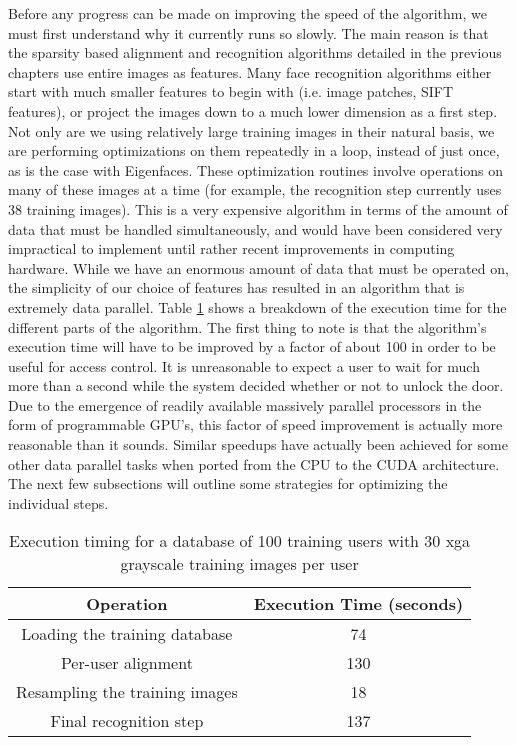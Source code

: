 Before any progress can be made on improving the speed of the algorithm, we
must first understand why it currently runs so slowly. The main reason is that
the sparsity based alignment and recognition algorithms detailed in the
previous chapters use entire images as features.  Many face recognition
algorithms either start with much smaller features to begin with (i.e. image
patches, SIFT features), or project the images down to a much lower dimension
as a first step.  Not only are we using relatively large training images in
their natural basis, we are performing optimizations on them repeatedly in a
loop, instead of just once, as is the case with Eigenfaces.   These
optimization routines involve operations on many of these images at a time (for
example, the recognition step currently uses 38 training images).  This is a
very expensive algorithm in terms of the amount of data that must be handled
simultaneously, and would have been considered very impractical to implement
until rather recent improvements in computing hardware.  While we have an
enormous amount of data that must be operated on, the simplicity of our choice
of features has resulted in an algorithm that is extremely data parallel.
Table \ref{tab:breakdown} shows a breakdown of the execution time for the
different parts of the algorithm.  The first thing to note is that the
algorithm's execution time will have to be improved by a factor of about 100 in
order to be useful for access control.  It is unreasonable to expect a user to
wait for much more than a second while the system decided whether or not to
unlock the door.  Due to the emergence of readily available massively parallel
processors in the form of programmable GPU's, this factor of speed improvement
is actually more reasonable than it sounds.  Similar speedups have actually
been achieved for some other data parallel tasks when ported from the CPU to
the CUDA architecture.  The next few subsections will outline some strategies
for optimizing the individual steps.
\begin{table}[h]
\centering
\begin{tabular}{|c|c|}
\hline
Operation & Execution Time (seconds)\\
\hline
Loading the training database & 74\\
\hline
Per-user alignment & 130\\
\hline
Resampling the training images & 18\\
\hline
Final recognition step &137\\
\hline
\end{tabular}\vspace{2mm}
\caption{Execution timing for a database of 100 training users with 30 xga grayscale training images per user} \label{tab:breakdown}
\end{table}

